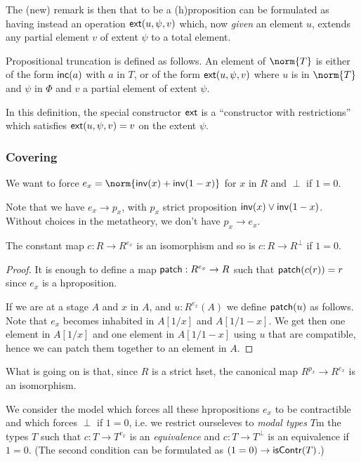     The (new) remark is then that to be a (h)proposition can be formulated as having instead
    an operation 
    $\mathsf{ext}(u,\psi,v)$ which, now {\em given}
    an element $u$, extends any partial element $v$ of extent $\psi$ to a total element.

\medskip    

Propositional truncation is defined as follows. An element of $\norm{T}$ is either of the form
$\mathsf{inc}(a)$ with $a$ in $T$, or of the form $\mathsf{ext}(u,\psi,v)$ where $u$ is in $\norm{T}$ and $\psi$
in $\Phi$ and $v$ a partial element of extent $\psi$.

In this definition, the special constructor $\mathsf{ext}$ is a ``constructor with restrictions'' which
satisfies $\mathsf{ext}(u,\psi,v) = v$ on the extent $\psi$.

\subsubsection{Covering}

We want to force $e_x = \norm{\inv(x)+\inv(1-x)}$ for $x$ in $R$ and $\perp$ if $1=0$.

Note that we have $e_x\rightarrow p_x$, with $p_x$ strict proposition $\mathsf{inv}(x)\vee \mathsf{inv}(1-x)$.
Without choices in the metatheory, we don't have $p_x\rightarrow e_x$.

\begin{lemma}
  The constant map $c:R\rightarrow R^{e_x}$ is an isomorphism and so is $c:R\rightarrow R^{\perp}$ if
  $1 = 0$.
\end{lemma}

\begin{proof}
  It is enough to define a map $\mathsf{patch}:R^{e_x}\rightarrow R$ such that $\mathsf{patch}(c(r)) = r$ since
  $e_x$ is a hproposition.

  If we are at a stage $A$ and $x$ in $A$, and $u:R^{e_x}(A)$ we define $\mathsf{patch}(u)$ as follows.
  Note that $e_x$ becomes inhabited in $A[1/x]$ and $A[1/1-x]$. We get then one element in $A[1/x]$
  and one element in $A[1/1-x]$ using $u$ that are compatible, hence we can patch them together to
  an element in $A$.
\end{proof}

What is going on is that, since $R$ is a strict hset, the canonical map $R^{p_x}\rightarrow R^{e_x}$ is
an isomorphism.

We consider the model which forces all these hpropositions $e_x$ to be contractible
and which forces $\perp$ if $1 = 0$, i.e. we restrict ourseleves to {\em modal types} $T$m the types
$T$ such that $c:T\rightarrow T^{e_x}$ is an {\em equivalence} and $c:T\rightarrow T^{\perp}$ is an equivalence
if $1=0$. (The second condition can be formulated as $(1=0)\rightarrow \mathsf{isContr}(T)$.)

